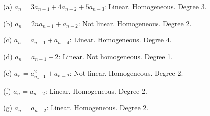 
(a)
$a_n = 3a_{n - 1} + 4a_{n - 2} + 5a_{n - 3}$: Linear. Homogeneous. Degree 3.

(b)
$a_n = 2 \underline{n} a_{n - 1} + a_{n - 2}$: Not linear. Homogeneous. Degree 2.

(c) $a_n = a_{n - 1} + a_{n - 4}$: Linear. Homogeneous. Degree 4.

(d) $a_n = a_{n-1} + \underline{2}$: Linear. Not homogeneous. Degree 1.

(e) $a_n = \underline{a^2_{n-1}} + a_{n-2}$: Not linear. Homogeneous. Degree 2.

(f) $a_n = a_{n-2}$: Linear. Homogeneous. Degree 2.

(g)
$a_n = a_{n-2}$: Linear. Homogeneous. Degree 2.



